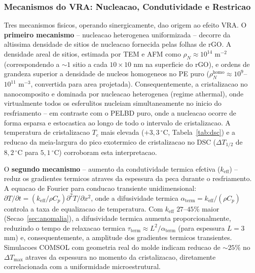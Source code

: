 \documentclass[11pt,a4paper,oneside]{article}
\begin{document}
\subsubsection{Mecanismos do VRA: Nucleacao, Condutividade e Restricao}\label{sec:vra_mec}

Tres mecanismos fisicos, operando sinergicamente, dao origem ao efeito VRA. O {\bfseries primeiro mecanismo} -- nucleacao heterogenea uniformizada -- decorre da altissima densidade de sitios de nucleacao fornecida pelas folhas de rGO. A densidade areal de sitios, estimada por TEM e AFM como $\rho_N{\approx}10^{14}$ m$^{-2}$ (correspondendo a ${\sim}1$ sitio a cada $10{\times}10$ nm na superficie do rGO), e ordens de grandeza superior a densidade de nucleos homogeneos no PE puro ($\rho_N^{\text{homo}}{\approx}10^9$--$10^{11}$ m$^{-3}$, convertida para area projetada). Consequentemente, a cristalizacao no nanocomposito e dominada por nucleacao heterogenea (regime athermal), onde virtualmente todos os esferulitos nucleiam simultaneamente no inicio do resfriamento -- em contraste com o PELBD puro, onde a nucleacao ocorre de forma esparsa e estocastica ao longo de todo o intervalo de cristalizacao. A temperatura de cristalizacao $T_c$ mais elevada ($+3{,}3\,^{\circ}$C, Tabela~\ref{tab:dsc}) e a reducao da meia-largura do pico exotermico de cristalizacao no DSC ($\Delta T_{1/2}$ de $8{,}2\,^{\circ}$C para $5{,}1\,^{\circ}$C) corroboram esta interpretacao.

O {\bfseries segundo mecanismo} -- aumento da condutividade termica efetiva ($k_{\text{eff}}$) -- reduz os gradientes termicos atraves da espessura da peca durante o resfriamento. A equacao de Fourier para conducao transiente unidimensional: $\partial T/\partial t{=}(k_{\text{eff}}/\rho C_p)\partial^2T/\partial x^2$, onde a difusividade termica $\alpha_{\text{term}}{=}k_{\text{eff}}/(\rho C_p)$ controla a taxa de equalizacao de temperatura. Com $k_{\text{eff}}$ $27$--$45\%$ maior (Secao~\ref{sec:anomalia}), a difusividade termica aumenta proporcionalmente, reduzindo o tempo de relaxacao termica $\tau_{\text{term}}{\approx}L^2/\alpha_{\text{term}}$ (para espessura $L{=}3$ mm) e, consequentemente, a amplitude dos gradientes termicos transientes. Simulacoes COMSOL com geometria real do molde indicam reducao de ${\sim}25\%$ no $\Delta T_{\max}$ atraves da espessura no momento da cristalizacao, diretamente correlacionada com a uniformidade microestrutural.
\end{document}
